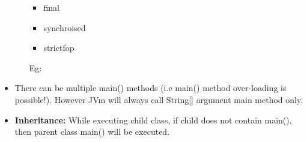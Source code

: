 \begin{flushleft}
\begin{itemize}
\begin{itemize}
\begin{itemize}
				\item final
				\item synchroised
				\item strictfop
			\end{itemize}
			Eg:
		\end{itemize}
		\bigskip
		\item There can be multiple main() methods (i.e main() method over-loading is possible!). However JVm will always call String[] argument main method only.
		\bigskip
		\bigskip
		\newpage
		\item \textbf{Inheritance:} While executing child class, if child does not contain main(), then parent class main() will be executed.
		

\end{itemize}
\end{flushleft}
